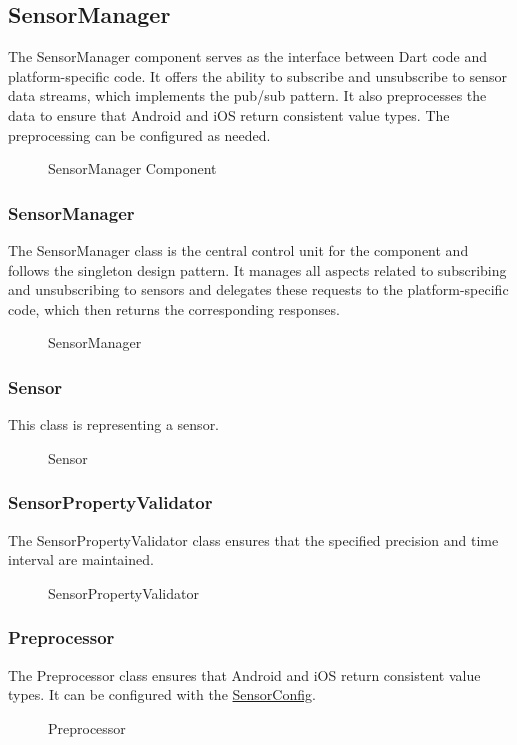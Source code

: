 \documentclass[12pt]{article}
\begin{document}
\subsection{SensorManager}
The SensorManager component serves as the interface between Dart code and platform-specific code. It offers the ability to subscribe and unsubscribe to sensor data streams, which implements the pub/sub pattern. It also preprocesses the data to ensure that Android and iOS return consistent value types. The preprocessing can be configured as needed.
\begin{figure}[ht]
\centering

\caption{\label{fig:bild9} SensorManager Component}
\end{figure}
\newpage
\subsubsection{SensorManager}
The SensorManager class is the central control unit for the component and follows the singleton design pattern. It manages all aspects related to subscribing and unsubscribing to sensors and delegates these requests to the platform-specific code, which then returns the corresponding responses.
\begin{figure}[ht]
\centering

\caption{\label{fig:bild10} SensorManager}
\end{figure}

\subsubsection{Sensor}
This class is representing a sensor.
\begin{figure}[ht]
\centering

\caption{\label{fig:bild11} Sensor}
\end{figure}
\newpage

\subsubsection{SensorPropertyValidator}
The SensorPropertyValidator class ensures that the specified precision and time interval are maintained.
\begin{figure}[ht]
\centering

\caption{\label{fig:bild12} SensorPropertyValidator}
\end{figure}


\subsubsection{Preprocessor}
The Preprocessor class ensures that Android and iOS return consistent value types. It can be configured with the \hyperref[fig:bild14]{SensorConfig}.
\begin{figure}[ht]
\centering

\caption{\label{fig:bild13} Preprocessor}
\end{figure}
\newpage
\end{document}
